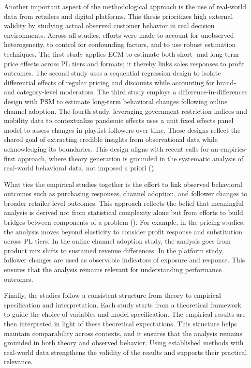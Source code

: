 Another important aspect of the methodological approach is the use of real-world data from retailers and digital platforms. This thesis prioritizes high external validity by studying actual observed customer behavior in real decision environments. Across all studies, efforts were made to account for unobserved heterogeneity, to control for confounding factors, and to use robust estimation techniques. The first study applies ECM to estimate both short- and long-term price effects across PL tiers and formats; it thereby links sales responses to profit outcomes. The second study uses a sequential regression design to isolate differential effects of regular pricing and discounts while accounting for brand- and category-level moderators. The third study employs a difference-in-differences design with PSM to estimate long-term behavioral changes following online channel adoption. The fourth study, leveraging government restriction indices and mobility data to contextualize pandemic effects uses a unit fixed effects panel model to assess changes in playlist followers over time. These designs reflect the shared goal of extracting credible insights from observational data while acknowledging its boundaries. This design aligns with recent calls for an empirics-first approach, where theory generation is grounded in the systematic analysis of real-world behavioral data, not imposed a priori (\cite{Golder2022-bo}).

What ties the empirical studies together is the effort to link observed behavioral outcomes such as purchasing responses, channel adoption, and follower changes to broader retailer-level outcomes. This approach reflects the belief that meaningful analysis is derived not from statistical complexity alone but from efforts to build bridges between components of a problem (\cite{Leeflang2014-fs}). For example, in the pricing studies, the analysis moves beyond elasticity to consider profit response and substitution across PL tiers. In the online channel adoption study, the analysis goes from product mix shifts to sustained revenue differences. In the platform study, follower changes are used as observable indicators of exposure and response. This ensures that the analysis remains relevant for understanding performance outcomes.

Finally, the studies follow a consistent structure from theory to empirical specification and interpretation. Each study starts from a theoretical framework to guide the choice of variables and model specification. The empirical results are then interpreted in light of these theoretical expectations. This structure helps maintain comparability across contexts, and it ensures that the analysis remains grounded in both theory and observed behavior. Using established methods with real-world data strengthens the validity of the results and supports their practical relevance.

